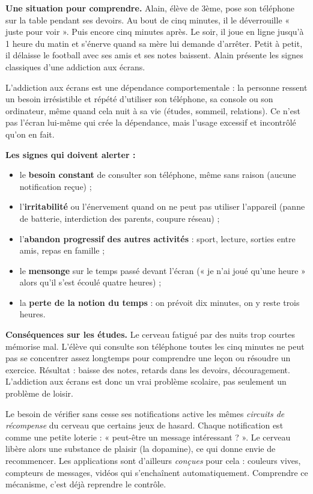 \documentclass[11pt]{article}
\newcommand{\cle}[1]{{\popxbold\color{popdark}#1}}
\newcounter{popsec}
\newcounter{popsub}
\newcommand{\courssub}[1]{%
  \stepcounter{popsub}%
  \par\vspace{9pt}\noindent{\popxbold\fontsize{11.5}{13}\selectfont\color{popink}{\color{poporange}\thepopsec.\thepopsub}\hspace{6pt}#1}\par\nopagebreak\vspace{4pt}
}
\begin{document}
\courssub{L'addiction aux écrans et aux jeux}

\textbf{Une situation pour comprendre.} Alain, élève de 3ème, pose son téléphone sur la table pendant ses devoirs. Au bout de cinq minutes, il le déverrouille « juste pour voir ». Puis encore cinq minutes après. Le soir, il joue en ligne jusqu'à 1 heure du matin et s'énerve quand sa mère lui demande d'arrêter. Petit à petit, il délaisse le football avec ses amis et ses notes baissent. Alain présente les signes classiques d'une \cle{addiction aux écrans}.

\begin{definition}
L'\cle{addiction aux écrans} est une dépendance comportementale : la personne ressent un besoin irrésistible et répété d'utiliser son téléphone, sa console ou son ordinateur, même quand cela nuit à sa vie (études, sommeil, relations). Ce n'est pas l'écran lui-même qui crée la dépendance, mais l'usage excessif et incontrôlé qu'on en fait.
\end{definition}

\textbf{Les signes qui doivent alerter :}
\begin{itemize}
  \item le \textbf{besoin constant} de consulter son téléphone, même sans raison (aucune notification reçue) ;
  \item l'\textbf{irritabilité} ou l'énervement quand on ne peut pas utiliser l'appareil (panne de batterie, interdiction des parents, coupure réseau) ;
  \item l'\textbf{abandon progressif des autres activités} : sport, lecture, sorties entre amis, repas en famille ;
  \item le \textbf{mensonge} sur le temps passé devant l'écran (« je n'ai joué qu'une heure » alors qu'il s'est écoulé quatre heures) ;
  \item la \textbf{perte de la notion du temps} : on prévoit dix minutes, on y reste trois heures.
\end{itemize}

\textbf{Conséquences sur les études.} Le cerveau fatigué par des nuits trop courtes mémorise mal. L'élève qui consulte son téléphone toutes les cinq minutes ne peut pas se concentrer assez longtemps pour comprendre une leçon ou résoudre un exercice. Résultat : baisse des notes, retards dans les devoirs, découragement. L'addiction aux écrans est donc un vrai problème scolaire, pas seulement un problème de loisir.

\begin{savaistu}
Le besoin de vérifier sans cesse ses notifications active les mêmes \emph{circuits de récompense} du cerveau que certains jeux de hasard. Chaque notification est comme une petite loterie : « peut-être un message intéressant ? ». Le cerveau libère alors une substance de plaisir (la dopamine), ce qui donne envie de recommencer. Les applications sont d'ailleurs \emph{conçues} pour cela : couleurs vives, compteurs de messages, vidéos qui s'enchaînent automatiquement. Comprendre ce mécanisme, c'est déjà reprendre le contrôle.
\end{savaistu}
\end{document}
